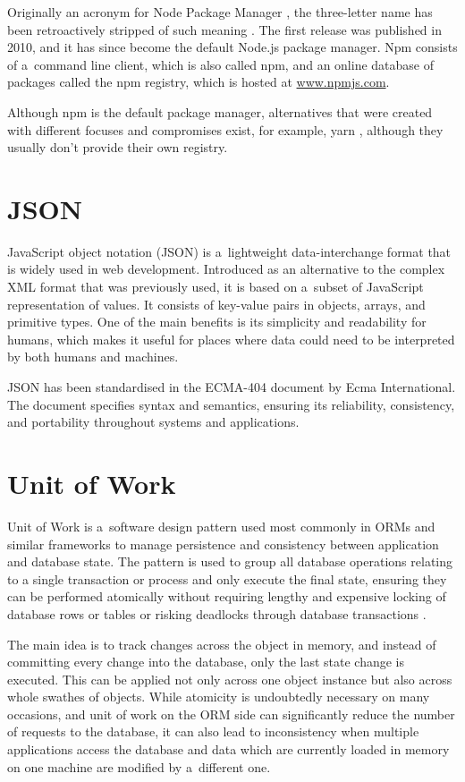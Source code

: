 Originally an acronym for Node Package Manager \cite{npm-old-readme}, the
three-letter name has been retroactively stripped of such meaning
\cite{npm-usage}. The first release was published in 2010, and it has since
become the default Node.js package manager. Npm consists of a~command line
client, which is also called npm, and an online database of packages called the
npm registry, which is hosted at \url{www.npmjs.com}. 

Although npm is the default package manager, alternatives that were created with
different focuses and compromises exist, for example, yarn \cite{Yarn}, although
they usually don't provide their own registry.

\section*{JSON}
JavaScript object notation (JSON) is a~lightweight data-interchange format that
is widely used in web development. Introduced as an alternative to the complex
XML format that was previously used, it is based on a~subset of JavaScript
representation of values. It consists of key-value pairs in objects, arrays, and
primitive types. One of the main benefits is its simplicity and readability for
humans, which makes it useful for places where data could need to be interpreted
by both humans and machines.

JSON has been standardised in the ECMA-404 \cite{ECMA-404} document by Ecma
International. The document specifies syntax and semantics, ensuring its
reliability, consistency, and portability throughout systems and applications.

\section*{Unit of Work}
Unit of Work is a~software design pattern used most commonly in ORMs and similar
frameworks to manage persistence and consistency between application and
database state. The pattern is used to group all database operations relating to
a single transaction or process and only execute the final state, ensuring they
can be performed atomically without requiring lengthy and expensive locking of
database rows or tables or risking deadlocks through database transactions
\cite[p.~184]{fowler-patterns-2003}.

The main idea is to track changes across the object in memory, and instead of
committing every change into the database, only the last state change is
executed. This can be applied not only across one object instance but also
across whole swathes of objects. While atomicity is undoubtedly necessary on
many occasions, and unit of work on the ORM side can significantly reduce the
number of requests to the database, it can also lead to inconsistency when
multiple applications access the database and data which are currently loaded in
memory on one machine are modified by a~different one.

